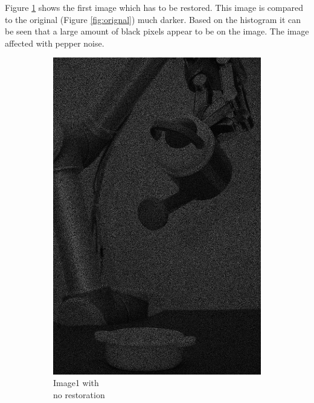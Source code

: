 Figure \ref{fig:img1_src} shows the first image which has to be restored. This image is compared to the original  (Figure \ref{fig:orignal}) much darker.  Based on the histogram  it can be seen that a large amount of black pixels appear to be on the image.  The image affected with pepper noise.  

\begin{figure}[H]
    \centering
    \begin{subfigure}[b]{0.23\textwidth}
        \includegraphics[width=\textwidth]{img1/Image1.png}
        \caption{Image1 with \\no restoration}
        \label{fig:img1_src}
    \end{subfigure}
    \begin{subfigure}[b]{0.446\textwidth}

\end{subfigure}
\end{figure}
